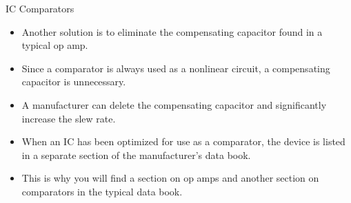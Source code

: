 \documentclass[pdflatex,compress]{beamer}
\begin{document}
\begin{frame}{IC Comparators}
	\begin{itemize}
			\item Another solution is to eliminate the compensating capacitor found in a typical op amp.
			\item Since a comparator is always used as a nonlinear circuit, a compensating capacitor is unnecessary.
			\item A manufacturer can delete the compensating capacitor and significantly increase the slew rate.
			\item When an IC has been optimized for use as a comparator, the device is listed in a separate section of the manufacturer's data book.
			\item This is why you will find a section on op amps and another section on comparators in the typical data book.
	\end{itemize}
\end{frame}
\end{document}
